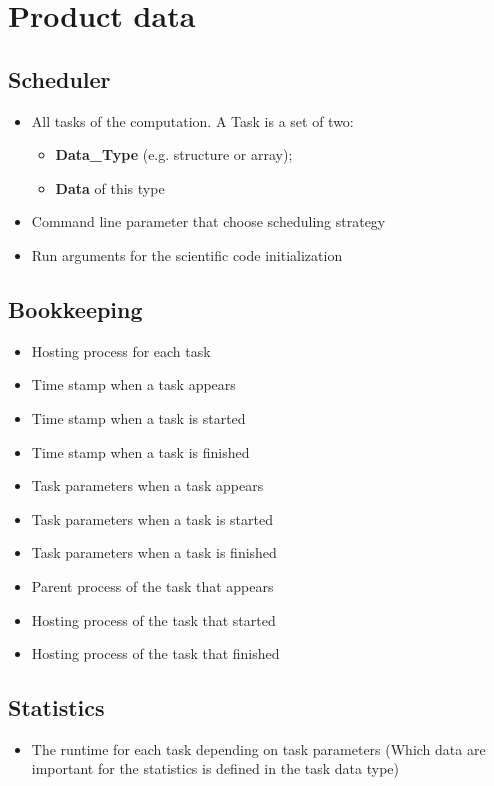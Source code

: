 {


\setcounter{funcD}{10}
\renewcommand{\labelitemi}{
	\ifnum \value{funcD}<10$/D 0\arabic{funcD} /$\addtocounter{funcD}{10}
	\else $/D \arabic{funcD} /$\addtocounter{funcD}{10}\fi
	}
\section{Product data}

	\subsection{Scheduler}
		\begin{itemize}
			\item All tasks of the computation. A Task is a set of two:
				\begin{itemize}
					\item \textbf{Data\_Type} (e.g. structure or array);
					\item \textbf{Data} of this type
				\end{itemize}
			\item Command line parameter that choose scheduling strategy
			\item Run arguments for the scientific code initialization
		\end{itemize}


	\subsection{Bookkeeping}
		\begin{itemize}
			\item Hosting process for each task
			\item Time stamp when a task appears
			\item Time stamp when a task is started
			\item Time stamp when a task is finished
			\item Task parameters when a task appears
			\item Task parameters when a task is started
			\item Task parameters when a task is finished
			\item Parent process of the task that appears
			\item Hosting process of the task that started
			\item Hosting process of the task that finished
		\end{itemize}
			
			
	\subsection{Statistics}
		\begin{itemize}
			\item The runtime for each task depending on task parameters (Which data are important for the statistics is defined in the task data type)
		\end{itemize}
}